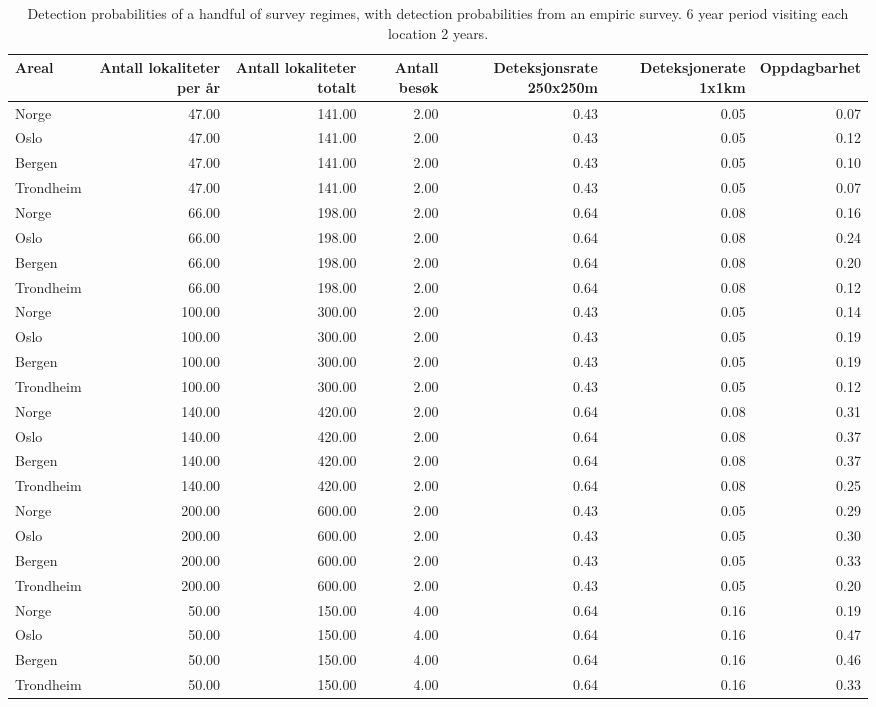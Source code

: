 \documentclass[]{article}
\begin{document}
\begin{table}[ht]
\centering
\begin{tabular}{lrrrrrr}
  \hline
Areal & Antall lokaliteter per år & Antall lokaliteter totalt & Antall besøk & Deteksjonsrate 250x250m & Deteksjonerate 1x1km & Oppdagbarhet \\ 
  \hline
Norge & 47.00 & 141.00 & 2.00 & 0.43 & 0.05 & 0.07 \\ 
  Oslo & 47.00 & 141.00 & 2.00 & 0.43 & 0.05 & 0.12 \\ 
  Bergen & 47.00 & 141.00 & 2.00 & 0.43 & 0.05 & 0.10 \\ 
  Trondheim & 47.00 & 141.00 & 2.00 & 0.43 & 0.05 & 0.07 \\ 
  Norge & 66.00 & 198.00 & 2.00 & 0.64 & 0.08 & 0.16 \\ 
  Oslo & 66.00 & 198.00 & 2.00 & 0.64 & 0.08 & 0.24 \\ 
  Bergen & 66.00 & 198.00 & 2.00 & 0.64 & 0.08 & 0.20 \\ 
  Trondheim & 66.00 & 198.00 & 2.00 & 0.64 & 0.08 & 0.12 \\ 
  Norge & 100.00 & 300.00 & 2.00 & 0.43 & 0.05 & 0.14 \\ 
  Oslo & 100.00 & 300.00 & 2.00 & 0.43 & 0.05 & 0.19 \\ 
  Bergen & 100.00 & 300.00 & 2.00 & 0.43 & 0.05 & 0.19 \\ 
  Trondheim & 100.00 & 300.00 & 2.00 & 0.43 & 0.05 & 0.12 \\ 
  Norge & 140.00 & 420.00 & 2.00 & 0.64 & 0.08 & 0.31 \\ 
  Oslo & 140.00 & 420.00 & 2.00 & 0.64 & 0.08 & 0.37 \\ 
  Bergen & 140.00 & 420.00 & 2.00 & 0.64 & 0.08 & 0.37 \\ 
  Trondheim & 140.00 & 420.00 & 2.00 & 0.64 & 0.08 & 0.25 \\ 
  Norge & 200.00 & 600.00 & 2.00 & 0.43 & 0.05 & 0.29 \\ 
  Oslo & 200.00 & 600.00 & 2.00 & 0.43 & 0.05 & 0.30 \\ 
  Bergen & 200.00 & 600.00 & 2.00 & 0.43 & 0.05 & 0.33 \\ 
  Trondheim & 200.00 & 600.00 & 2.00 & 0.43 & 0.05 & 0.20 \\ 
  Norge & 50.00 & 150.00 & 4.00 & 0.64 & 0.16 & 0.19 \\ 
  Oslo & 50.00 & 150.00 & 4.00 & 0.64 & 0.16 & 0.47 \\ 
  Bergen & 50.00 & 150.00 & 4.00 & 0.64 & 0.16 & 0.46 \\ 
  Trondheim & 50.00 & 150.00 & 4.00 & 0.64 & 0.16 & 0.33 \\ 
   \hline
\end{tabular}
\caption{Detection probabilities of a handful of survey regimes, with detection probabilities from an empiric survey. 6 year period visiting each location 2 years.} 
\end{table}
\end{document}
